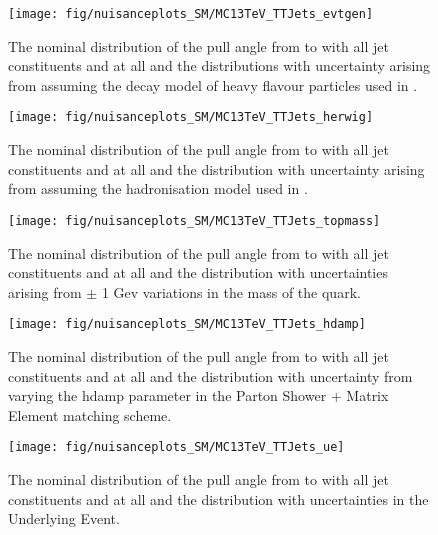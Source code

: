 \begin{figure}[hbtp]
  \centering
  \def\twidth{0.45}
  \texttt{[image: fig/nuisanceplots\_SM/MC13TeV\_TTJets\_evtgen]}
  \caption{The nominal distribution of the pull angle from \leadingjet to \scndleadingjet with all jet constituents and at all \DeltaR and the distributions with uncertainty arising from assuming the decay model of heavy flavour particles used in \EVTGEN.}
  \label{fig:MC13TeV_TTJets_evtgen}
\end{figure}

\begin{figure}[hbtp]
  \centering
  \def\twidth{0.45}
  \texttt{[image: fig/nuisanceplots\_SM/MC13TeV\_TTJets\_herwig]}
  \caption{The nominal distribution of the pull angle from \leadingjet to \scndleadingjet with all jet constituents and at all \DeltaR and the distribution with uncertainty arising from assuming the hadronisation model used in \HERWIGpp.}
  \label{fig:MC13TeV_TTJets_herwig}
\end{figure}

\begin{figure}[hbtp]
  \centering
  \def\twidth{0.45}
  \texttt{[image: fig/nuisanceplots\_SM/MC13TeV\_TTJets\_topmass]}
  \caption{The nominal distribution of the pull angle from \leadingjet to \scndleadingjet with all jet constituents and at all \DeltaR and the distribution with uncertainties arising from $\pm$ 1 Gev variations in the mass of the \cPqt quark.}
  \label{fig:MC13TeV_TTJets_topmass}
\end{figure}

\begin{figure}[hbtp]
  \centering
  \def\twidth{0.45}
  \texttt{[image: fig/nuisanceplots\_SM/MC13TeV\_TTJets\_hdamp]}
  \caption{The nominal distribution of the pull angle from \leadingjet to \scndleadingjet with all jet constituents and at all \DeltaR and the distribution with uncertainty from varying the hdamp parameter in the Parton Shower + Matrix Element matching scheme.}
  \label{fig:MC13TeV_TTJets_hdamp}
\end{figure}

\begin{figure}[hbtp]
  \def\twidth{0.45}
  \centering
  \texttt{[image: fig/nuisanceplots\_SM/MC13TeV\_TTJets\_ue]}
  \caption{The nominal distribution of the pull angle from \leadingjet to \scndleadingjet with all jet constituents and at all \DeltaR and the distribution with uncertainties in the Underlying Event.}
  \label{fig:MC13TeV_TTJets_ue}
\end{figure}

